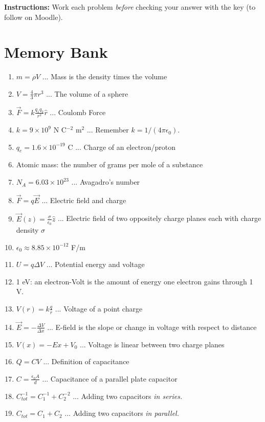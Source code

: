 \documentclass[10pt]{article}
\begin{document}
\maketitle

\textbf{Instructions:} Work each problem \textit{before} checking your answer with the key (to follow on Moodle). \\ \vspace{0.25cm}

\section{Memory Bank}

\begin{enumerate}
\item $m = \rho V$ ... Mass is the density times the volume
\item $V = \frac{4}{3}\pi r^3$ ... The volume of a sphere
\item $\vec{F} = k \frac{q_1 q_2}{r^2}\hat{r}$ ... Coulomb Force
\item $k = 9 \times 10^{9}$ N C$^{-2}$ m$^{2}$ ... Remember $k = 1/(4\pi \epsilon_0)$.
\item $q_e = 1.6 \times 10^{-19}$ C ... Charge of an electron/proton
\item Atomic mass: the number of grams per mole of a substance
\item $N_A = 6.03 \times 10^{23}$ ... Avagadro's number
\item $\vec{F} = q \vec{E}$ ... Electric field and charge
\item $\vec{E}(z) = \frac{\sigma}{\epsilon_0}\hat{z}$ ... Electric field of two oppositely charge planes each with charge density $\sigma$
\item $\epsilon_0 \approx 8.85 \times 10^{-12}$ F/m
\item $U = q\Delta V$ ... Potential energy and voltage
\item 1 eV: an electron-Volt is the amount of energy one electron gains through 1 V.
\item $V(r) = k\frac{q}{r}$ ... Voltage of a point charge
\item $\vec{E} = -\frac{\Delta V}{\Delta x}$ ... E-field is the slope or change in voltage with respect to distance
\item $V(x) = -E x + V_0$ ... Voltage is linear between two charge planes
\item $Q = CV$ ... Definition of capacitance
\item $C = \frac{\epsilon_0 A}{d}$ ... Capacitance of a parallel plate capacitor
\item $C_{tot}^{-1} = C_1^{-1} + C_2^{-2}$ ... Adding two capacitors \textit{in series.}
\item $C_{tot} = C_1 + C_2$ ... Adding two capacitors \textit{in parallel.}
\end{enumerate}
\end{document}
